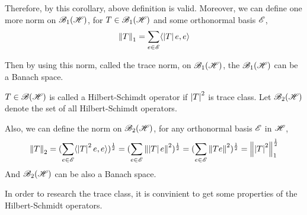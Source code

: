 Therefore, by this corollary, above definition is valid. Moreover, we can define one more norm on $\mathscr{B}_{1}\mathscr{(H)}$, for $T \in \mathscr{B}_{1}\mathscr{(H)}$ and some orthonormal basis $\mathscr{E}$,
\begin{equation*}
	\left\lVert T\right\lVert_1 = \sum_{e \in \mathscr{E}} \langle \left\lvert T\right\lvert e,e \rangle
\end{equation*}

Then by using this norm, called the trace norm, on $\mathscr{B}_{1}\mathscr{(H)}$, the $\mathscr{B}_{1}\mathscr{(H)}$ can be a Banach space.

\begin{defn}
	$T \in \mathscr{B(H)}$ is called a Hilbert-Schimdt operator if $\left\lvert T\right\lvert^2$ is trace class. Let $\mathscr{B}_{2}\mathscr{(H)}$ denote the set of all Hilbert-Schimdt operators. 
\end{defn}

Also, we can define the norm on $\mathscr{B}_{2}\mathscr{(H)}$, for any orthonormal basis $\mathscr{E}$ in $\mathscr{H}$,
\begin{equation*}
	\left\lVert T\right\lVert_2 = (\sum_{e \in \mathscr{E}} \langle \left\lvert T\right\lvert^2e,e \rangle)^{\frac{1}{2}} = (\sum_{e \in \mathscr{E}} \left\lVert\left\lvert T\right\lvert e\right\lVert^2)^{\frac{1}{2}} = (\sum_{e \in \mathscr{E}} \left\lVert Te\right\lVert^2)^{\frac{1}{2}} = \left\lVert\left\lvert T\right\lvert^2\right\lVert_1^{\frac{1}{2}}
\end{equation*}
And $\mathscr{B}_{2}\mathscr{(H)}$ can be also a Banach space.

In order to research the trace class, it is convinient to get some properties of the Hilbert-Schmidt operators.


